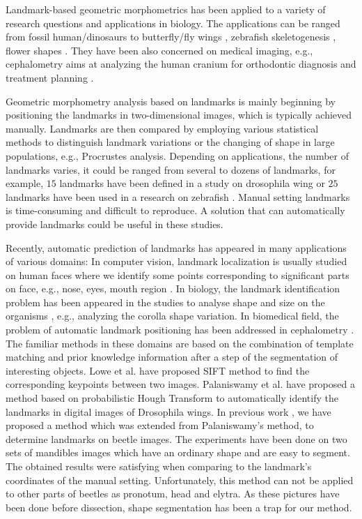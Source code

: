 \documentclass[review]{elsarticle}
\begin{document}
Landmark-based geometric morphometrics has been applied to a variety of research questions and applications in biology. The applications can be ranged from fossil human/dinosaurs \cite{rosas2015geometric, fearon2015morphometric} to butterfly/fly wings \cite{chazot2016morpho}, zebrafish skeletogenesis \cite{aceto2015zebrafish}, flower shapes \cite{van2010three}. They have been also concerned on medical imaging, e.g., cephalometry aims at analyzing the human cranium for orthodontic diagnosis and treatment planning \cite{lindner2016fully, grau2001automatic}. 

Geometric morphometry analysis based on landmarks is mainly beginning by positioning the landmarks in two-dimensional images, which is typically achieved manually. Landmarks are then compared by employing various statistical methods to distinguish landmark variations or the changing of shape in large populations, e.g., Procrustes analysis. Depending on applications, the number of landmarks varies, it could be ranged from several to dozens of landmarks, for example, $15$ landmarks have been defined in a study on drosophila wing \cite{palaniswamy2010automatic} or $25$ landmarks have been used in a research on zebrafish \cite{aceto2015zebrafish, vandaele2018landmark}. Manual setting landmarks is time-consuming and difficult to reproduce. A solution that can automatically provide landmarks could be useful in these studies.

Recently, automatic prediction of landmarks has appeared in many applications of various domains: In computer vision, landmark localization is usually studied on human faces where we identify some points corresponding to significant parts on face, e.g., nose, eyes, mouth region \cite{burgos2013robust, yang2013sieving}. In biology, the landmark identification problem has been appeared in the studies to analyse shape and size on the organisms \cite{palaniswamy2010automatic, savriama2018step}, e.g., analyzing the corolla shape variation. In biomedical field, the problem of automatic landmark positioning has been addressed in cephalometry \cite{grau2001automatic, mohseni2007automatic}. The familiar methods in these domains are based on the combination of template matching and prior knowledge information after a step of the segmentation of interesting objects. Lowe et al. \cite{lowe2004distinctive} have proposed SIFT method to find the corresponding keypoints between two images. Palaniswamy et al. \cite{palaniswamy2010automatic} have proposed a method based on probabilistic Hough Transform to automatically identify the landmarks in digital images of Drosophila wings. In previous work \cite{le2017maelab}, we have proposed a method which was extended from Palaniswamy's method, to determine landmarks on beetle images. The experiments have been done on two sets of mandibles images which have an ordinary shape and are easy to segment. The obtained results were satisfying when comparing to the landmark's coordinates of the manual setting. Unfortunately, this method can not be applied to other parts of beetles as pronotum, head and elytra. As these pictures have been done before dissection, shape segmentation has been a trap for our method.
\end{document}
